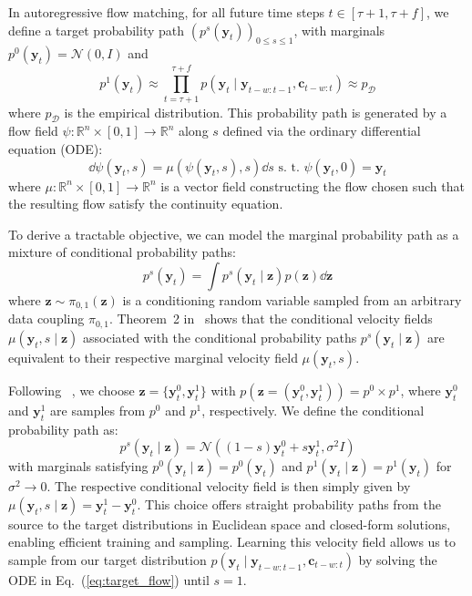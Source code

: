 \documentclass[a4paper,10pt,twocolumn,preprint,3p]{elsarticle}
\begin{document}
In autoregressive flow matching, for all future time steps $t \in [\tau+1, \tau+f]$, we define a target probability path $(p^s(\mathbf{y}_t))_{0\le s \le 1}$, with marginals $p^0(\mathbf{y}_t) = \mathcal{N}(0,I)$ and  $$p^1(\mathbf{y}_t) \approx \prod_{t=\tau+1}^{\tau+f}p(\mathbf{y}_{t} \mid \mathbf{y}_{t-w:t-1}, \mathbf{c}_{t-w:t}) \approx p_\mathcal{D}$$ where $p_\mathcal{D}$ is the empirical distribution. This probability path is generated by a flow field $\psi\colon \mathbb{R}^n \times [0,1] \to \mathbb{R}^n$ along $s$ defined via the ordinary differential equation (ODE):
\begin{equation}\label{eq:target_flow}
\dd \psi(\mathbf{y}_{t}, s) = \mu(\psi(\mathbf{y}_{t},s),s) \dd s \text{ s.~t. } \psi(\mathbf{y}_{t}, 0) = \mathbf{y}_{t}
\end{equation}
where $\mu \colon \mathbb{R}^n \times [0,1] \to \mathbb{R}^n$ is a vector field constructing the flow chosen such that the resulting flow satisfy the continuity equation.

To derive a tractable objective, we can model the marginal probability path as a mixture of conditional probability paths:
\begin{equation}
p^s(\mathbf{y}_{t}) = \int p^s(\mathbf{y}_{t} \mid \mathbf{z})p(\mathbf{z})\dd \mathbf{z}
\end{equation}
where $\mathbf{z} \sim \pi_{0,1}(\mathbf{z})$ is a conditioning random variable sampled from an arbitrary data coupling $\pi_{0,1}$.
Theorem~2 in~\citep{Lipman2022} shows that the conditional velocity fields $\mu(\mathbf{y}_{t}, s\mid\mathbf{z})$ associated with the conditional probability paths $p^s(\mathbf{y}_{t} \mid \mathbf{z})$ are equivalent to their respective marginal velocity field $\mu(\mathbf{y}_{t}, s)$.

Following ~\citep{tong2023improving}, we choose $\mathbf{z} = \{\mathbf{y}^0_t, \mathbf{y}_t^1\}$ with $p(\mathbf{z}=(\mathbf{y}_t^0, \mathbf{y}_t^1)) = p^0 \times p^1$, where $\mathbf{y}_t^0$ and $\mathbf{y}_t^1$ are samples from $p^0$ and $p^1$, respectively. We define the conditional probability path as:
\begin{equation}
p^s(\mathbf{y}_t \mid \mathbf{z}) = \mathcal{N}((1-s)\mathbf{y}_t^0 + s\mathbf{y}_t^1, \sigma^2 I)
\label{eq:prob_path}
\end{equation}
with marginals satisfying $p^0(\mathbf{y}_t\mid\mathbf{z})= p^0(\mathbf{y}_t)$ and $p^1(\mathbf{y}_t \mid \mathbf{z}) = p^1(\mathbf{y}_t)$ for $\sigma^2 \to 0$. The respective conditional velocity field is then simply given by $\mu(\mathbf{y}_t, s\mid\mathbf{z}) = \mathbf{y}_t^1 - \mathbf{y}_t^0$.
This choice offers straight probability paths from the source to the target distributions in Euclidean space and closed-form solutions, enabling efficient training and sampling. Learning this velocity field allows us to sample from our target distribution $p(\mathbf{y}_{t} \mid \mathbf{y}_{t-w:t-1}, \mathbf{c}_{t-w:t})$ by solving the ODE in
Eq.~(\ref{eq:target_flow}) until $s=1$. 
\end{document}
